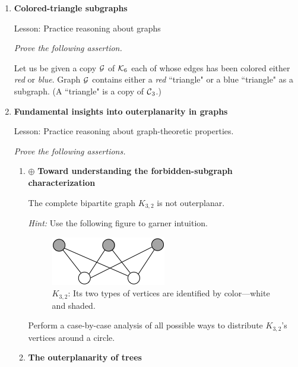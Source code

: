 \begin{enumerate}
\medskip\item
{\bf Colored-triangle subgraphs}

{\sc Lesson:} Practice reasoning about graphs

\smallskip

{\em Prove the following assertion.}

\begin{prop}
Let us be given a copy $\mbox{$\cal G$}$ of $\mbox{$\cal K$}_6$ each of whose edges has been colored either {\em red} or {\em blue}.  Graph $\mbox{$\cal G$}$ contains either a {\em red} ``triangle" or a blue ``triangle" as a subgraph.  (A ``triangle" is a copy of $\mbox{$\cal C$}_3$.)
\end{prop}

\medskip\item
{\bf Fundamental insights into outerplanarity in graphs}

{\sc Lesson:} Practice reasoning about graph-theoretic properties.

\smallskip

{\em Prove the following assertions.}

  \begin{enumerate}
  \item
$\oplus$
{\bf Toward understanding the forbidden-subgraph characterization}

\begin{prop}
The complete bipartite graph $K_{3,2}$ is not outerplanar.
\end{prop}

\smallskip

{\em Hint:} Use the following figure to garner intuition.
\begin{figure}[h]
\begin{center}
        \includegraphics[scale=0.35]{FiguresGraph/outerplanarK3,2init} 
\caption{$K_{3,2}$: Its two types of vertices are identified by color---white and shaded.}
\end{center}
\end{figure}
Perform a case-by-case analysis of all possible ways to distribute $K_{3,2}$'s vertices around a circle.

  \medskip\item
{\bf The outerplanarity of trees}

\smallskip


\end{enumerate}
\end{enumerate}
